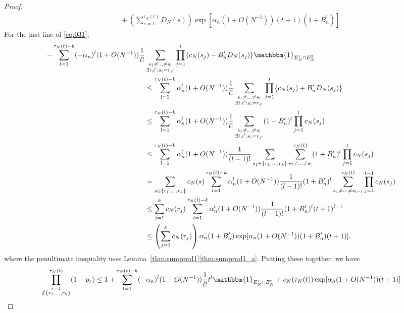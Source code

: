 \documentclass{article}
\newcommand{\1}[1]{\mathbbm{1}_{#1}}
\begin{document}
\begin{proof}
\begin{align}
    &\qquad+ \left( \sum_{s=1}^{\tau_N(t)} D_N(s) \right)
        \exp[ \alpha_n (1+O(N^{-1})) (t+1) (1+B_n^\prime) ] .
\end{align}
For the last line of \eqref{eq:031},
\begin{align}
- \sum_{l=1}^{\tau_N(t) -k} (-\alpha_n)^l (1+O(N^{-1})) \frac{1}{l!}
        &\sum_{\substack{s_1\neq\dots\neq s_l \\ \exists i,i^\prime 
        : s_i=r_{i^\prime} }}
        \prod_{j=1}^l \{ c_N(s_j) - B_n^\prime D_N(s_j) \} 
        \1{E_N^1 \cap E_N^2} \notag\\
&\leq \sum_{l=1}^{\tau_N(t) -k} \alpha_n^l (1+O(N^{-1})) \frac{1}{l!}
        \sum_{\substack{s_1\neq\dots\neq s_l \\ \exists i,i^\prime 
        : s_i=r_{i^\prime} }}
        \prod_{j=1}^l \{ c_N(s_j) + B_n^\prime D_N(s_j) \} \notag\\
&\leq \sum_{l=1}^{\tau_N(t) -k} \alpha_n^l (1+O(N^{-1})) \frac{1}{l!}
        \sum_{\substack{s_1\neq\dots\neq s_l \\ \exists i,i^\prime 
        : s_i=r_{i^\prime} }}
        (1 + B_n^\prime)^l \prod_{j=1}^l c_N(s_j) \notag\\
&\leq \sum_{l=1}^{\tau_N(t) -k} \alpha_n^l (1+O(N^{-1}))
        \frac{1}{(l-1)!} \sum_{s_1 \in \{r_1,\dots,r_k\} } 
        \sum_{s_2\neq \dots\neq s_l}^{\tau_N(t)}
        (1 + B_n^\prime)^l \prod_{j=1}^l c_N(s_j) \notag\\
&= \sum_{s \in \{r_1,\dots,r_k\} } c_N(s)
        \sum_{l=1}^{\tau_N(t) -k} \alpha_n^l (1+O(N^{-1}))
        \frac{1}{(l-1)!}  (1 + B_n^\prime)^l
        \sum_{s_1\neq \dots\neq s_{l-1}}^{\tau_N(t)} 
        \prod_{j=1}^{l-1} c_N(s_j) \notag\\
&\leq \sum_{j=1}^k c_N(r_j)
        \sum_{l=1}^{\tau_N(t) -k} \alpha_n^l (1+O(N^{-1}))
        \frac{1}{(l-1)!}  (1 + B_n^\prime)^l (t+1)^{l-1} \notag\\
&\leq \left( \sum_{j=1}^k c_N(r_j) \right)
        \alpha_n (1 + B_n^\prime) 
        \exp[ \alpha_n (1+O(N^{-1})) (1 + B_n^\prime) (t+1) ] ,
\end{align}
where the penultimate inequality uses Lemma~\ref{thm:sumprod1}\ref{thm:sumprod1_a}.
Putting these together, we have
\begin{align}
\prod_{\substack{r=1 \\ \notin \{r_1,\dots,r_k\} }}^{\tau_N(t)} (1-p_r)
&\leq 1+ \sum_{l=1}^{\tau_N(t) -k} (-\alpha_n)^l (1+O(N^{-1})) \frac{1}{l!} t^l
        \1{E_N^1 \cap E_N^2}
        + c_N(\tau_N(t)) \exp[ \alpha_n (1+O(N^{-1})) (t+1) ] \notag\\

\end{align}
\end{proof}
\end{document}
